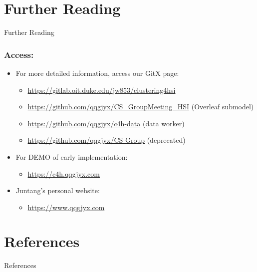 \documentclass[10pt,svgnames,fragile]{beamer}
\begin{document}
\section{Further Reading}
\begin{frame}{Further Reading}
    \frametitle{Access:}
    \begin{itemize}
        \item For more detailed information, access our GitX page:

        \begin{itemize}
            \item {\color{blue} \href{https://gitlab.oit.duke.edu/jw853/clustering4hsi}{https://gitlab.oit.duke.edu/jw853/clustering4hsi}}
            
            \item {\color{blue} \href{https://github.com/qqgjyx/CS_GroupMeeting_HSI}{https://github.com/qqgjyx/CS\_GroupMeeting\_HSI}} {\tiny (Overleaf submodel)}

            \item {\color{blue} \href{https://github.com/qqgjyx/c4h-data}{https://github.com/qqgjyx/c4h-data}} {\tiny (data worker)}

            \item {\color{blue} \href{https://github.com/qqgjyx/CS-Group}{https://github.com/qqgjyx/CS-Group}} {\tiny \color{red}(deprecated)}
        \end{itemize}
        

        \item For DEMO of early implementation:
        \begin{itemize}
            \item {\color{blue} \href{http://c4h.qqgjyx.com}{https://c4h.qqgjyx.com}}
        \end{itemize}

        
        \item Juntang's personal website:
        \begin{itemize}
            \item {\color{blue} \href{https://www.qqgjyx.com}{https://www.qqgjyx.com}}
        \end{itemize}
    \end{itemize}    
\end{frame}

\section{References}
\begin{frame}[allowframebreaks]{References}
\small


\end{frame}
\end{document}
